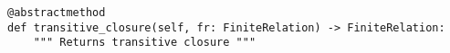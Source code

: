 \par\begin{minipage}{67ex}
\begin{verbatim}
@abstractmethod
def transitive_closure(self, fr: FiniteRelation) -> FiniteRelation:
    """ Returns transitive closure """
\end{verbatim}
\end{minipage}\par